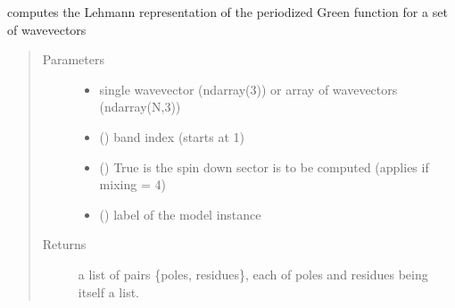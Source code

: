 \documentclass[letterpaper,10pt,english]{sphinxmanual}
\begin{document}
\begin{fulllineitems}
\label{\detokenize{functions:pyqcm.Lehmann_Green_function}}
\sphinxAtStartPar
computes the Lehmann representation of the periodized Green function for a set of wavevectors
\begin{quote}\begin{description}
\item[{Parameters}] \leavevmode\begin{itemize}
\item {} 
\sphinxAtStartPar
{} \textendash{} single wavevector (ndarray(3)) or array of wavevectors (ndarray(N,3))

\item {} 
\sphinxAtStartPar
{} () \textendash{} band index (starts at 1)

\item {} 
\sphinxAtStartPar
{} () \textendash{} True is the spin down sector is to be computed (applies if mixing = 4)

\item {} 
\sphinxAtStartPar
{} () \textendash{} label of the model instance

\end{itemize}

\item[{Returns}] \leavevmode
\sphinxAtStartPar
a list of pairs \{poles, residues\}, each of poles and residues being itself a list.

\end{description}\end{quote}

\end{fulllineitems}

\end{document}
